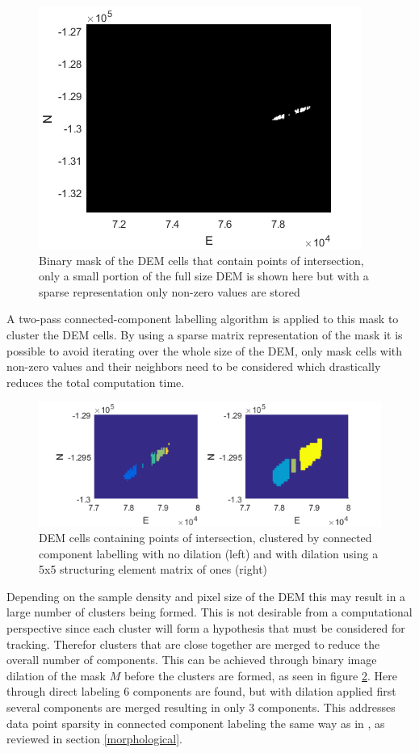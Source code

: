\documentclass[journal]{IEEEtran}
\begin{document}
\begin{figure}[ht]
    \centering
    \includegraphics[scale=0.75]{intersectionmask.png}
    \caption{Binary mask of the DEM cells that contain points of intersection, only a small portion of the full size DEM is shown here but with a sparse representation only non-zero values are stored}
    \label{fig:intersectionmask}
\end{figure}

A two-pass connected-component labelling algorithm is applied to this mask to cluster the DEM cells. By using a sparse matrix representation of the mask it is possible to avoid iterating over the whole size of the DEM, only mask cells with non-zero values and their neighbors need to be considered which drastically reduces the total computation time.

\begin{figure}[ht]
    \centering
    \includegraphics[scale=0.65]{components.png}
    \caption{DEM cells containing points of intersection, clustered by connected component labelling with no dilation (left) and with dilation using a 5x5 structuring element matrix of ones (right)}
    \label{fig:connectedcomponents}
\end{figure}

Depending on the sample density and pixel size of the DEM this may result in a large number of clusters being formed. This is not desirable from a computational perspective since each cluster will form a hypothesis that must be considered for tracking. Therefor clusters that are close together are merged to reduce the overall number of components. This can be achieved through binary image dilation of the mask $M$ before the clusters are formed, as seen in figure \ref{fig:connectedcomponents}. Here through direct labeling 6 components are found, but with dilation applied first several components are merged resulting in only 3 components. This addresses data point sparsity in connected component labeling the same way as in \cite{ravankar2015connected}, as reviewed in section \ref{morphological}.
\end{document}
